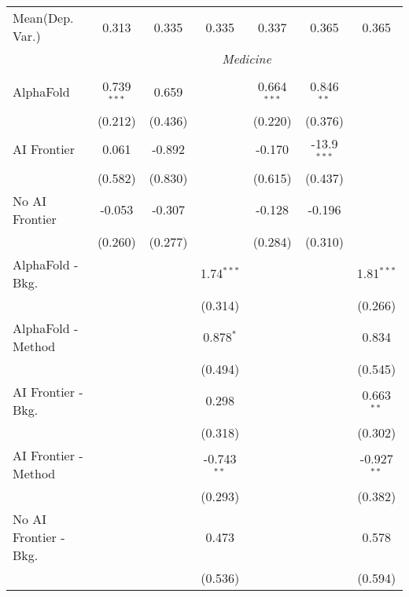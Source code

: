 \begin{tabular}{lcccccc}
Mean(Dep. Var.) & 0.313 & 0.335 & 0.335 & 0.337 & 0.365 & 0.365 \\
 & \multicolumn{6}{c}{\textit{Medicine}} \\ \\
   AlphaFold               & 0.739$^{***}$ & 0.659   &               & 0.664$^{***}$ & 0.846$^{**}$  &   \\   
                           & (0.212)       & (0.436) &               & (0.220)       & (0.376)       &   \\   
   AI Frontier             & 0.061         & -0.892  &               & -0.170        & -13.9$^{***}$ &   \\   
                           & (0.582)       & (0.830) &               & (0.615)       & (0.437)       &   \\   
   No AI Frontier          & -0.053        & -0.307  &               & -0.128        & -0.196        &   \\   
                           & (0.260)       & (0.277) &               & (0.284)       & (0.310)       &   \\   
   AlphaFold - Bkg.        &               &         & 1.74$^{***}$  &               &               & 1.81$^{***}$\\   
                           &               &         & (0.314)       &               &               & (0.266)\\   
   AlphaFold - Method      &               &         & 0.878$^{*}$   &               &               & 0.834\\   
                           &               &         & (0.494)       &               &               & (0.545)\\   
   AI Frontier - Bkg.      &               &         & 0.298         &               &               & 0.663$^{**}$\\   
                           &               &         & (0.318)       &               &               & (0.302)\\   
   AI Frontier - Method    &               &         & -0.743$^{**}$ &               &               & -0.927$^{**}$\\   
                           &               &         & (0.293)       &               &               & (0.382)\\   
   No AI Frontier - Bkg.   &               &         & 0.473         &               &               & 0.578\\   
                           &               &         & (0.536)       &               &               & (0.594)\\   

\end{tabular}
